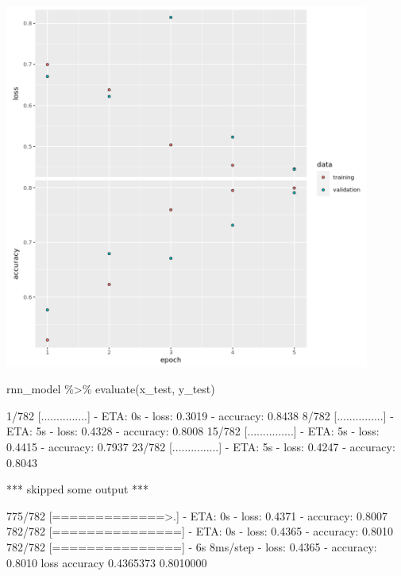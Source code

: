 \documentclass[
  12pt,
]{krantz}
\makeatletter
\newenvironment{Shaded}{\begin{snugshade}}{\end{snugshade}}
\newcommand{\FunctionTok}[1]{\textcolor[rgb]{0,0,0}{#1}}
\newcommand{\NormalTok}[1]{#1}
\newcommand{\SpecialCharTok}[1]{\textcolor[rgb]{0,0,0}{#1}}
\newenvironment{kframe}{%
\medskip{}
\setlength{\fboxsep}{.8em}
 \def\at@end@of@kframe{}%
 \ifinner\ifhmode%
  \def\at@end@of@kframe{\end{minipage}}%
  \begin{minipage}{\columnwidth}%
 \fi\fi%
 \def\FrameCommand##1{\hskip\@totalleftmargin \hskip-\fboxsep
 \colorbox{shadecolor}{##1}\hskip-\fboxsep
     \hskip-\linewidth \hskip-\@totalleftmargin \hskip\columnwidth}%
 \MakeFramed {\advance\hsize-\width
   \@totalleftmargin\z@ \linewidth\hsize
   \@setminipage}}%
 {\par\unskip\endMakeFramed%
 \at@end@of@kframe}
\renewenvironment{Shaded}{\begin{kframe}}{\end{kframe}}
\makeatother
\begin{document}
\includegraphics[width=0.9\textwidth,height=\textheight]{images/rnnhandson1.png}

\begin{Shaded}
\begin{Highlighting}[]
\NormalTok{rnn\_model }\SpecialCharTok{\%\textgreater{}\%} 
   \FunctionTok{evaluate}\NormalTok{(x\_test, y\_test)}
\end{Highlighting}
\end{Shaded}

\begin{Shaded}
\begin{Highlighting}[]
\NormalTok{  1/782 [...............] {-} ETA: 0s {-} loss: 0.3019 {-} accuracy: 0.8438}
\NormalTok{  8/782 [...............] {-} ETA: 5s {-} loss: 0.4328 {-} accuracy: 0.8008}
\NormalTok{ 15/782 [...............] {-} ETA: 5s {-} loss: 0.4415 {-} accuracy: 0.7937}
\NormalTok{ 23/782 [...............] {-} ETA: 5s {-} loss: 0.4247 {-} accuracy: 0.8043}

\NormalTok{*** skipped some output ***}

\NormalTok{775/782 [=============\textgreater{}.] {-} ETA: 0s {-} loss: 0.4371 {-} accuracy: 0.8007}
\NormalTok{782/782 [===============] {-} ETA: 0s {-} loss: 0.4365 {-} accuracy: 0.8010}
\NormalTok{782/782 [===============] {-} 6s 8ms/step {-} loss: 0.4365 {-} accuracy: 0.8010}
\NormalTok{     loss  accuracy }
\NormalTok{0.4365373 0.8010000 }
\end{Highlighting}
\end{Shaded}
\end{document}
